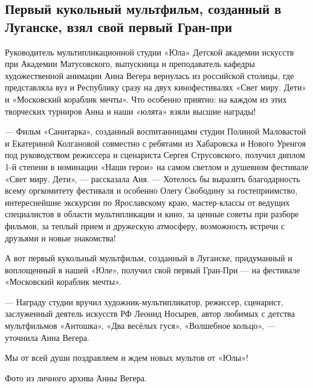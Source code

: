  
 
 
 
 
\subsection{Первый кукольный мультфильм, созданный в Луганске, взял свой первый Гран-при}
\label{sec:https://lgaki.info/novosti/pervyj-kukolnyj-multfilm-sozdannyj-v-luganske-vzyal-svoj-pervyj-gran-pri}

Руководитель мультипликационной студии «Юла» Детской академии искусств при
Академии Матусовского, выпускница и преподаватель кафедры художественной
анимации Анна Вегера вернулась из российской столицы, где представляла вуз и
Республику сразу на двух кинофестивалях «Свет миру. Дети» и «Московский
кораблик мечты». Что особенно приятно: на каждом из этих творческих турниров
Анна и наши «юлята» взяли высшие награды!


— Фильм «Санитарка», созданный воспитанницами студии Полиной Маловастой и
Екатериной Колгановой совместно с ребятами из Хабаровска и Нового Уренгоя под
руководством режиссера и сценариста Сергея Струсовского, получил диплом 1-й
степени в номинации «Наши герои» на самом светлом и душевном фестивале «Свет
миру. Дети», — рассказала Аня. — Хотелось бы выразить благодарность всему
оргкомитету фестиваля и особенно Олегу Свободину за гостеприимство,
интереснейшие экскурсии по Ярославскому краю, мастер-классы от ведущих
специалистов в области мультипликации и кино, за ценные советы при разборе
фильмов, за теплый прием и дружескую атмосферу, возможность встречи с друзьями
и новые знакомства!


А вот первый кукольный мультфильм, созданный в Луганске, придуманный и
воплощенный в нашей «Юле», получил свой первый Гран-При — на фестивале
«Московский кораблик мечты».

— Награду студии вручил художник-мультипликатор, режиссер, сценарист,
заслуженный деятель искусств РФ Леонид Носырев, автор любимых с детства
мультфильмов «Антошка», «Два весёлых гуся», «Волшебное кольцо», — уточнила Анна
Вегера.

Мы от всей души поздравляем и ждем новых мультов от «Юлы»!

Фото из личного архива Анны Вегера.
